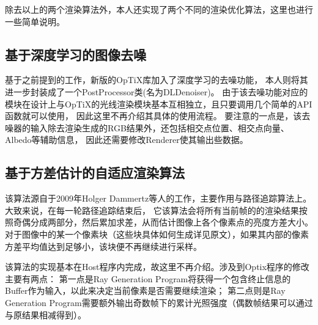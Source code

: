 除去以上的两个渲染算法外，本人还实现了两个不同的渲染优化算法，这里也进行一些简单说明。

\subsection{基于深度学习的图像去噪}

基于之前提到的工作\cite{NvidiaDenoiser}，新版的OpTiX库加入了深度学习的去噪功能，
本人则将其进一步封装成了一个PostProcessor类(名为DLDenoiser)。
由于该去噪功能对应的模块在设计上与OpTiX的光线渲染模块基本互相独立，且只要调用几个简单的API函数就可以使用，
因此这里不再介绍其具体的使用流程。
要注意的一点是，该去噪器的输入除去渲染生成的RGB结果外，还包括相交点位置、相交点向量、Albedo等辅助信息，
因此还需要修改Renderer使其输出些数据。

\subsection{基于方差估计的自适应渲染算法}

\label{adaptive}

该算法源自于2009年Holger Dammertz等人的工作\cite{AdaptiveSampling}，主要作用与路径追踪算法上。
大致来说，在每一轮路径追踪结束后，
它该算法会将所有当前帧的的渲染结果按照奇偶分成两部分，然后累加求差，从而估计图像上各个像素点的亮度方差大小。
对于图像中的某一个像素块（这些块具体如何生成详见原文），如果其内部的像素方差平均值达到足够小，该块便不再继续进行采样。

该算法的实现基本在Host程序内完成，故这里不再介绍。涉及到Optix程序的修改主要有两点：
第一点是Ray Generation Program将获得一个包含终止信息的Buffer作为输入，以此来决定当前像素是否需要继续渲染；
第二点则是Ray Generation Program需要额外输出奇数帧下的累计光照强度（偶数帧结果可以通过与原结果相减得到）。

